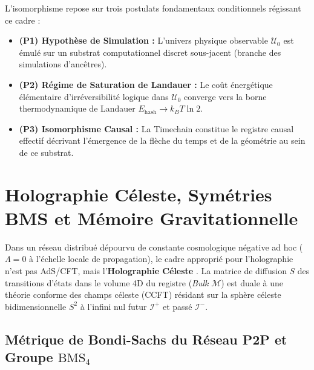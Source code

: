 \documentclass[10pt,twocolumn,a4paper]{article}
\theoremstyle{plain}
\theoremstyle{definition}
\theoremstyle{remark}
\newcommand{\scri}{\mathcal{I}}
\begin{document}
L'isomorphisme repose sur trois postulats fondamentaux conditionnels régissant ce cadre :
\begin{itemize}
    \item \textbf{(P1) Hypothèse de Simulation : } L'univers physique observable $\mathcal{U}_0$ est émulé sur un substrat computationnel discret sous-jacent (branche des simulations d'ancêtres).
    \item \textbf{(P2) Régime de Saturation de Landauer : } Le coût énergétique élémentaire d'irréversibilité logique dans $\mathcal{U}_0$ converge vers la borne thermodynamique de Landauer $E_{\text{hash}} \to k_B T \ln 2$.
    \item \textbf{(P3) Isomorphisme Causal : } La Timechain constitue le registre causal effectif décrivant l'émergence de la flèche du temps et de la géométrie au sein de ce substrat.
\end{itemize}


\section{Holographie Céleste, Symétries BMS et Mémoire Gravitationnelle}

Dans un réseau distribué dépourvu de constante cosmologique négative ad hoc ($\Lambda = 0$ à l'échelle locale de propagation), le cadre approprié pour l'holographie n'est pas AdS/CFT, mais l'\textbf{Holographie Céleste} \cite{Pasterski2017,Strominger2017}. La matrice de diffusion $S$ des transitions d'états dans le volume 4D du registre (\textit{Bulk} $\mathcal{M}$) est duale à une théorie conforme des champs céleste (CCFT) résidant sur la sphère céleste bidimensionnelle $S^2$ à l'infini nul futur $\scri^+$ et passé $\scri^-$.

\subsection{Métrique de Bondi-Sachs du Réseau P2P et Groupe $\text{BMS}_4$}
\end{document}
